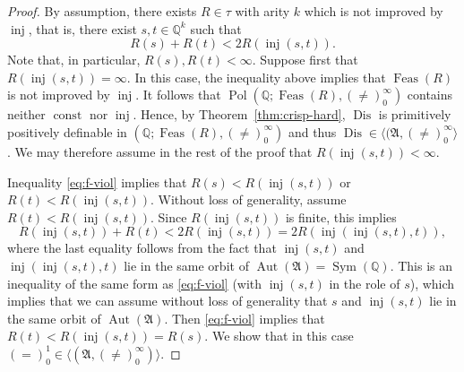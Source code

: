 \documentclass[preprint,12pt]{elsarticle}
\newcommand{\Q}{\mathbb Q}
\newcommand{\bA}{{\mathfrak A}}
\DeclareMathOperator{\Aut}{Aut}
\DeclareMathOperator{\Pol}{Pol}
\DeclareMathOperator{\Feas}{Feas}
\DeclareMathOperator{\Sym}{Sym}
\DeclareMathOperator{\inj}{inj}
\DeclareMathOperator{\const}{const}
\DeclareMathOperator{\Dis}{Dis}
\begin{document}
\begin{proof}
By assumption, there exists $R \in \tau$ with arity $k$ which is not improved by $\inj$, that is, there exist $s,t \in \Q^k$ such that
\begin{equation}\label{eq:f-viol}
R(s)+R(t) < 2 R(\inj(s,t)).
\end{equation}
Note that, in particular, $R(s),R(t) < \infty$.
Suppose first that $R(\inj(s,t))=\infty$. In this case, the inequality above implies that $\Feas(R)$ is not improved by $\inj$.
%
It follows that $\Pol(\mathbb{Q}; \Feas(R), (\neq)_0^\infty)$ contains neither $\const$ nor $\inj$. 
Hence, by Theorem~\ref{thm:crisp-hard}, $\Dis$ is primitively positively definable in $(\mathbb{Q}; \Feas(R), (\neq)_0^\infty)$ %
and thus $\Dis \in \langle (\bA,(\neq)_0^\infty \rangle$. We may therefore assume in the rest of the proof that $R(\inj(s,t))<\infty$.

Inequality \eqref{eq:f-viol} implies that $R(s) < R(\inj(s,t))$ or $R(t) < R(\inj(s,t))$. Without loss of generality, assume $R(t)<R(\inj(s,t))$. Since $R(\inj(s,t))$ is finite, this implies \[R(\inj(s,t)) + R(t) < 2 R(\inj(s,t)) = 2 R(\inj(\inj(s,t),t)),\]
where the last equality follows from the fact that $\inj(s,t)$ and $\inj(\inj(s,t),t)$ lie in the same orbit of $\Aut(\bA)=\Sym(\mathbb{Q})$. This is an inequality of the same form as \eqref{eq:f-viol} (with $\inj(s,t)$ in the role of $s$), which implies that we can assume without loss of generality that $s$ and $\inj(s,t)$ lie in the same orbit of $\Aut(\bA)$.  
Then \eqref{eq:f-viol} implies that 
$R(t) < R(\inj(s,t))=R(s)$. We show that in this case $(=)^1_0 \in \langle (\bA,(\neq)_0^\infty) \rangle$.


\end{proof}
\end{document}

